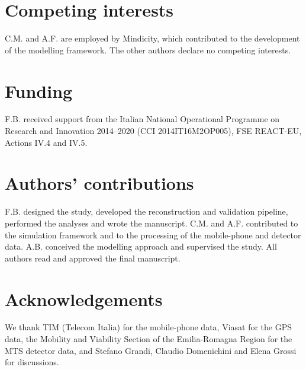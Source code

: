 \documentclass[pdflatex,Numbered]{sn-jnl}
\begin{document}
\section*{Competing interests}

C.M. and A.F. are employed by Mindicity, which contributed to the development of the modelling framework. The other authors declare no competing interests.

\section*{Funding}

F.B. received support from the Italian National Operational Programme on Research and Innovation 2014--2020 (CCI 2014IT16M2OP005), FSE REACT-EU, Actions IV.4 and IV.5.

\section*{Authors' contributions}

F.B. designed the study, developed the reconstruction and validation pipeline, performed the analyses and wrote the manuscript. C.M. and A.F. contributed to the simulation framework and to the processing of the mobile-phone and detector data. A.B. conceived the modelling approach and supervised the study. All authors read and approved the final manuscript.

\section*{Acknowledgements}

We thank TIM (Telecom Italia) for the mobile-phone data, Viasat for the GPS data, the Mobility and Viability Section of the Emilia-Romagna Region for the MTS detector data, and Stefano Grandi, Claudio Domenichini and Elena Grossi for discussions.



\end{document}
